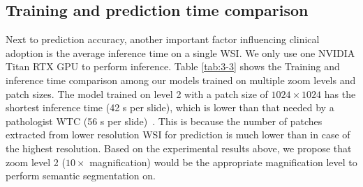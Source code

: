 \subsection{Training and prediction time comparison}\label{se:3-4.3}

Next to prediction accuracy, another important factor influencing clinical adoption is the average inference time on a single WSI. We only use one NVIDIA Titan RTX GPU to perform inference. Table \ref{tab:3-3} shows the Training and inference time comparison among our models trained on multiple zoom levels and patch sizes. The model trained on level 2 with a patch size of $1024\times1024$ has the shortest inference time (42 s per slide), which is lower than that needed by a pathologist WTC (56 s per slide)~\cite{Bejnordi2017}. This is because the number of patches extracted from lower resolution WSI for prediction is much lower than in case of the highest resolution. Based on the experimental results above, we propose that zoom level 2 ($10\times$ magnification) would be the appropriate magnification level to perform semantic segmentation on.

\begin{table}[!h]
\centering
\caption{Training and prediction time comparison of our models trained on different zoom levels and patch sizes}
\label{tab:3-3}
\end{table}

